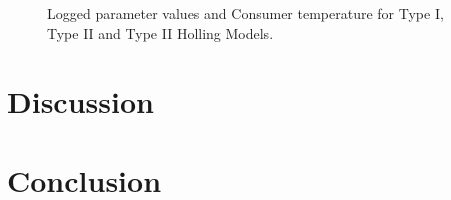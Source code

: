 \documentclass{article}
\begin{document}
\begin{figure}[h!t]
\caption{Logged parameter values and Consumer temperature for Type I, Type II and Type II Holling Models.}
\label{fig:tempparam}
\end{figure}
\section{Discussion}
\section{Conclusion}




\clearpage{}

%
%
\printbibliography
\end{document}
